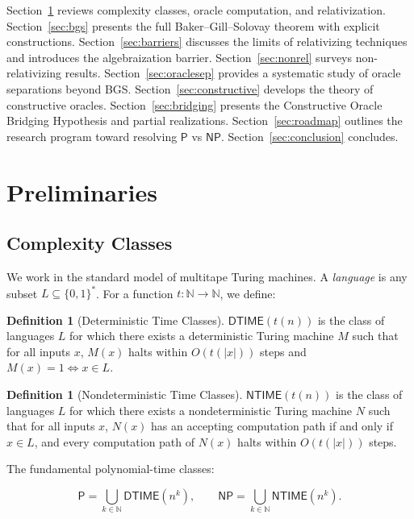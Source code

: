 \documentclass[11pt,a4paper]{article}
\theoremstyle{plain}
\theoremstyle{definition}
\newtheorem{definition}[theorem]{Definition}
\theoremstyle{remark}
\newcommand{\N}{\mathbb{N}}
\newcommand{\PP}{\mathsf{P}}
\newcommand{\NP}{\mathsf{NP}}
\newcommand{\DTIME}{\mathsf{DTIME}}
\newcommand{\NTIME}{\mathsf{NTIME}}
\newcommand{\bitsstar}{\{0,1\}^*}
\begin{document}
Section~\ref{sec:prelim} reviews complexity classes, oracle computation, and
relativization.  Section~\ref{sec:bgs} presents the full Baker--Gill--Solovay
theorem with explicit constructions.  Section~\ref{sec:barriers} discusses the
limits of relativizing techniques and introduces the algebraization barrier.
Section~\ref{sec:nonrel} surveys non-relativizing results.  Section~\ref{sec:oraclesep}
provides a systematic study of oracle separations beyond BGS.
Section~\ref{sec:constructive} develops the theory of constructive oracles.
Section~\ref{sec:bridging} presents the Constructive Oracle Bridging Hypothesis
and partial realizations.  Section~\ref{sec:roadmap} outlines the research
program toward resolving $\PP$ vs $\NP$.  Section~\ref{sec:conclusion} concludes.

\section{Preliminaries}\label{sec:prelim}

\subsection{Complexity Classes}

We work in the standard model of multitape Turing machines.  A \emph{language}
is any subset $L \subseteq \bitsstar$.  For a function $t : \N \to \N$, we
define:

\begin{definition}[Deterministic Time Classes]
$\DTIME(t(n))$ is the class of languages $L$ for which there exists a
deterministic Turing machine $M$ such that for all inputs $x$, $M(x)$ halts
within $O(t(|x|))$ steps and $M(x) = 1 \iff x \in L$.
\end{definition}

\begin{definition}[Nondeterministic Time Classes]
$\NTIME(t(n))$ is the class of languages $L$ for which there exists a
nondeterministic Turing machine $N$ such that for all inputs $x$, $N(x)$ has
an accepting computation path if and only if $x \in L$, and every computation
path of $N(x)$ halts within $O(t(|x|))$ steps.
\end{definition}

The fundamental polynomial-time classes:

\[
\PP = \bigcup_{k \in \N} \DTIME(n^k), \qquad
\NP = \bigcup_{k \in \N} \NTIME(n^k).
\]
\end{document}
